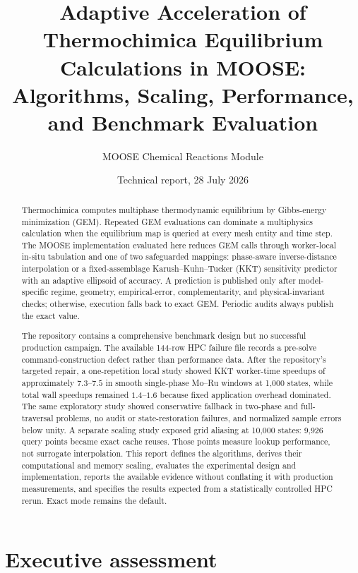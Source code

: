 \documentclass[11pt]{article}
\title{Adaptive Acceleration of Thermochimica Equilibrium Calculations in MOOSE:\\
Algorithms, Scaling, Performance, and Benchmark Evaluation}
\author{MOOSE Chemical Reactions Module}
\date{Technical report, 28 July 2026}
\begin{document}
\maketitle

\begin{abstract}
Thermochimica computes multiphase thermodynamic equilibrium by Gibbs-energy minimization (GEM).
Repeated GEM evaluations can dominate a multiphysics calculation when the equilibrium map is
queried at every mesh entity and time step.  The MOOSE implementation evaluated here reduces GEM
calls through worker-local in-situ tabulation and one of two safeguarded mappings: phase-aware
inverse-distance interpolation or a fixed-assemblage Karush--Kuhn--Tucker (KKT) sensitivity
predictor with an adaptive ellipsoid of accuracy.  A prediction is published only after
model-specific regime, geometry, empirical-error, complementarity, and physical-invariant checks;
otherwise, execution falls back to exact GEM.  Periodic audits always publish the exact value.

The repository contains a comprehensive benchmark design but no successful production campaign.
The available 144-row HPC failure file records a pre-solve command-construction defect rather
than performance data.  After the repository's targeted repair, a one-repetition local study
showed KKT worker-time speedups of approximately \(7.3\)--\(7.5\) in smooth single-phase Mo--Ru
windows at 1,000 states, while total wall speedups remained \(1.4\)--\(1.6\) because fixed
application overhead dominated.  The same exploratory study showed conservative fallback in
two-phase and full-traversal problems, no audit or state-restoration failures, and normalized
sample errors below unity.  A separate scaling study exposed grid aliasing at 10,000 states:
9,926 query points became exact cache reuses.  Those points measure lookup performance, not
surrogate interpolation.  This report defines the algorithms, derives their computational and
memory scaling, evaluates the experimental design and implementation, reports the available
evidence without conflating it with production measurements, and specifies the results expected
from a statistically controlled HPC rerun.  Exact mode remains the default.
\end{abstract}

\tableofcontents

\section{Executive assessment}
\end{document}
